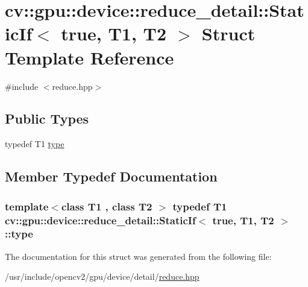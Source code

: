 \hypertarget{structcv_1_1gpu_1_1device_1_1reduce__detail_1_1StaticIf_3_01true_00_01T1_00_01T2_01_4}{\section{cv\-:\-:gpu\-:\-:device\-:\-:reduce\-\_\-detail\-:\-:Static\-If$<$ true, T1, T2 $>$ Struct Template Reference}
\label{structcv_1_1gpu_1_1device_1_1reduce__detail_1_1StaticIf_3_01true_00_01T1_00_01T2_01_4}
}


{\ttfamily \#include $<$reduce.\-hpp$>$}

\subsection*{Public Types}
\begin{DoxyCompactItemize}
\item 
typedef T1 \hyperlink{structcv_1_1gpu_1_1device_1_1reduce__detail_1_1StaticIf_3_01true_00_01T1_00_01T2_01_4_a2dbf6cbd75ec07667df9737b0d3904e0}{type}
\end{DoxyCompactItemize}


\subsection{Member Typedef Documentation}
\hypertarget{structcv_1_1gpu_1_1device_1_1reduce__detail_1_1StaticIf_3_01true_00_01T1_00_01T2_01_4_a2dbf6cbd75ec07667df9737b0d3904e0}{
\subsubsection[{type}]{\setlength{\rightskip}{0pt plus 5cm}template$<$class T1 , class T2 $>$ typedef T1 {\bf cv\-::gpu\-::device\-::reduce\-\_\-detail\-::\-Static\-If}$<$ {\bf true}, T1, T2 $>$\-::{\bf type}}}\label{structcv_1_1gpu_1_1device_1_1reduce__detail_1_1StaticIf_3_01true_00_01T1_00_01T2_01_4_a2dbf6cbd75ec07667df9737b0d3904e0}


The documentation for this struct was generated from the following file\-:\begin{DoxyCompactItemize}
\item 
/usr/include/opencv2/gpu/device/detail/\hyperlink{detail_2reduce_8hpp}{reduce.\-hpp}\end{DoxyCompactItemize}
